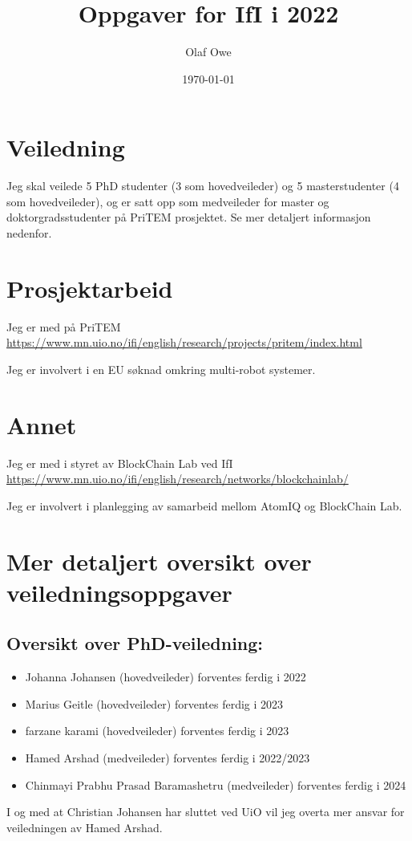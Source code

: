 \documentclass[11pt]{article}
\author{Olaf Owe}
\date{\today}
\title{Oppgaver for IfI i 2022}
\begin{document}
\maketitle


\section*{Veiledning}
\label{sec-1}
Jeg skal veilede 5 PhD studenter (3 som hovedveileder)
og 5 masterstudenter  (4 som hovedveileder),
og er satt opp som medveileder for master og doktorgradsstudenter
på PriTEM prosjektet. Se mer detaljert informasjon nedenfor.
\section*{Prosjektarbeid}
\label{sec-2}
Jeg er med på PriTEM 
\url{https://www.mn.uio.no/ifi/english/research/projects/pritem/index.html}

\noindent 
Jeg er involvert i en EU søknad omkring multi-robot systemer.

\section*{Annet}
\label{sec-3}
Jeg er med i styret av BlockChain Lab ved IfI
\url{https://www.mn.uio.no/ifi/english/research/networks/blockchainlab/}

\noindent 
Jeg er involvert i planlegging av  samarbeid mellom AtomIQ og  BlockChain Lab.
\section*{Mer detaljert oversikt over veiledningsoppgaver}
\label{sec-4}
\subsection*{Oversikt over PhD-veiledning:}
\label{sec-4-1}

\begin{itemize}
\item Johanna Johansen (hovedveileder) forventes ferdig i 2022
\item Marius Geitle  (hovedveileder) forventes ferdig i 2023
\item farzane karami  (hovedveileder) forventes ferdig i 2023
\item Hamed Arshad  (medveileder) forventes ferdig i 2022/2023
\item Chinmayi Prabhu Prasad Baramashetru  (medveileder) forventes ferdig
i 2024
\end{itemize}
I og med at Christian Johansen har sluttet ved UiO
vil jeg overta mer ansvar for veiledningen av Hamed Arshad.
\end{document}
